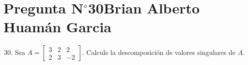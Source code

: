 \section{Pregunta N$^{\circ}$30\qquad Brian Alberto Huamán Garcia}


\begin{frame}
	\begin{enumerate}\setcounter{enumi}{29}
		\item

		      Sea
		      \begin{math}
			      A=
			      \begin{bmatrix}
				      3 & 2 & 2  \\
				      2 & 3 & -2
			      \end{bmatrix}
		      \end{math}.
		      Calcule la descomposición de valores singulares de $A$.
	\end{enumerate}


\end{frame}
